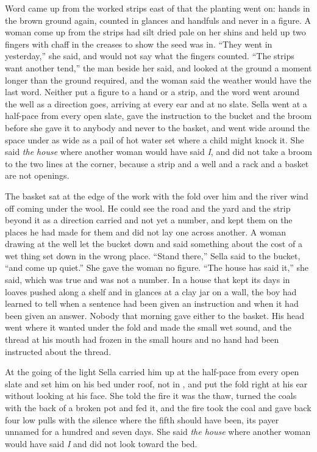 \scenebreak

Word came up from the worked strips east of  that the planting went on: hands in the brown ground again, counted in glances and handfuls and never in a figure. A woman come up from the strips had silt dried pale on her shins and held up two fingers with chaff in the creases to show the seed was in. “They went in yesterday,” she said, and would not say what the fingers counted. “The strips want another tend,” the man beside her said, and looked at the ground a moment longer than the ground required, and the woman said the weather would have the last word. Neither put a figure to a hand or a strip, and the word went around the well as a direction goes, arriving at every ear and at no slate. Sella went at a half-pace from every open slate, gave the instruction to the bucket and the broom before she gave it to anybody and never to the basket, and went wide around the space under  as wide as a pail of hot water set where a child might knock it. She said \emph{the house} where another woman would have said \emph{I}, and did not take a broom to the two lines at the corner, because a strip and a well and a rack and a basket are not openings.

The basket sat at the edge of the work with the fold over him and the river wind off  coming under the wool. He could see the road and the yard and the strip beyond it as a direction carried and not yet a number, and kept them on the places he had made for them and did not lay one across another. A woman drawing at the well let the bucket down and said something about the cost of a wet thing set down in the wrong place. “Stand there,” Sella said to the bucket, “and come up quiet.” She gave the woman no figure. “The house has said it,” she said, which was true and was not a number. In a house that kept its days in loaves pushed along a shelf and in glances at a clay jar on a wall, the boy had learned to tell when a sentence had been given an instruction and when it had been given an answer. Nobody that morning gave either to the basket. His head went where it wanted under the fold and made the small wet sound, and the thread at his mouth had frozen in the small hours and no hand had been instructed about the thread.

\scenebreak

At the going of the light Sella carried him up at the half-pace from every open slate and set him on his bed under  roof, not in , and put the fold right at his ear without looking at his face. She told the fire it was the thaw, turned the coals with the back of a broken pot and fed it, and the fire took the coal and gave back four low pulls with the silence where the fifth should have been, its payer unnamed for a hundred and seven days. She said \emph{the house} where another woman would have said \emph{I} and did not look toward the bed.

